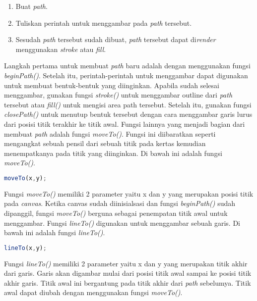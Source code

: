 \begin{enumerate}
	\item Buat \textit{path}.
	\item Tuliskan perintah untuk menggambar pada \textit{path} tersebut.
	\item Sesudah \textit{path} tersebut sudah dibuat, \textit{path} tersebut dapat di\textit{render} menggunakan \textit{stroke} atau \textit{fill}.
\end{enumerate}

Langkah pertama untuk membuat \textit{path} baru adalah dengan menggunakan fungsi \textit{beginPath()}. Setelah itu, perintah-perintah untuk menggambar dapat digunakan untuk membuat bentuk-bentuk yang diinginkan. Apabila sudah selesai menggambar, gunakan fungsi \textit{stroke()} untuk menggambar outline dari \textit{path} tersebut atau \textit{fill()} untuk mengisi area path tersebut. Setelah itu, gunakan fungsi \textit{closePath()} untuk menutup bentuk tersebut dengan cara menggambar garis lurus dari posisi titik terakhir ke titik awal. Fungsi lainnya yang menjadi bagian dari membuat \textit{path} adalah fungsi \textit{moveTo()}. Fungsi ini diibaratkan seperti mengangkat sebuah pensil dari sebuah titik pada kertas kemudian menempatkanya pada titik yang diinginkan. Di bawah ini adalah fungsi \textit{moveTo()}.

\begin{lstlisting}[language=Javascript, caption=Fungsi \textit{moveTo()}]
	moveTo(x,y);
\end{lstlisting}

Fungsi \textit{moveTo()} memiliki 2 parameter yaitu x dan y yang merupakan posisi titik pada \textit{canvas}. Ketika canvas sudah diinisialsasi dan fungsi \textit{beginPath()} sudah dipanggil, fungsi \textit{moveTo()} berguna sebagai penempatan titik awal untuk menggambar. Fungsi \textit{lineTo()} digunakan untuk menggambar sebuah garis. Di bawah ini adalah fungsi \textit{lineTo()}.

\begin{lstlisting}[language=Javascript, caption=Fungsi \textit{lineTo()}]
	lineTo(x,y);
\end{lstlisting}

Fungsi \textit{lineTo()} memiliki 2 parameter yaitu x dan y yang merupakan titik akhir dari garis. Garis akan digambar mulai dari posisi titik awal sampai ke posisi titik akhir garis. Titik awal ini bergantung pada titik akhir dari \textit{path} sebelumya. Titik awal dapat diubah dengan menggunakan fungsi \textit{moveTo()}.

